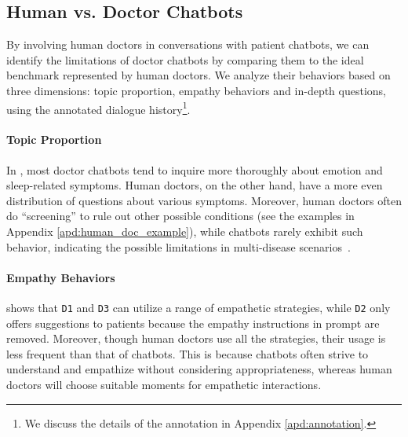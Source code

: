 \subsection{Human vs. Doctor Chatbots}
\label{sec:comp_doctor}

By involving human doctors in conversations with patient chatbots, we can identify the limitations of doctor chatbots by comparing them to the ideal benchmark represented by human doctors. We analyze their behaviors based on three dimensions: topic proportion, empathy behaviors and in-depth questions, using the annotated dialogue history\footnote{We discuss the details of the annotation in Appendix \ref{apd:annotation}.}.

\paragraph{Topic Proportion}
In , most doctor chatbots tend to inquire more thoroughly about emotion and sleep-related symptoms. Human doctors, on the other hand, have a more even distribution of questions about various symptoms.
Moreover, human doctors often do ``screening'' to rule out other possible conditions (see the examples in Appendix \ref{apd:human_doc_example}), while chatbots rarely exhibit such behavior, indicating the possible limitations in multi-disease scenarios~\cite{Zhang2022SymptomIF}.

\paragraph{Empathy Behaviors}
 shows that \texttt{D1} and \texttt{D3} can utilize a range of empathetic strategies, while \texttt{D2} only offers suggestions to patients because the empathy instructions in prompt are removed. Moreover, though human doctors use all the strategies, their usage is less frequent than that of chatbots. This is because chatbots often strive to understand and empathize without considering appropriateness, whereas human doctors will choose suitable moments for empathetic interactions.

